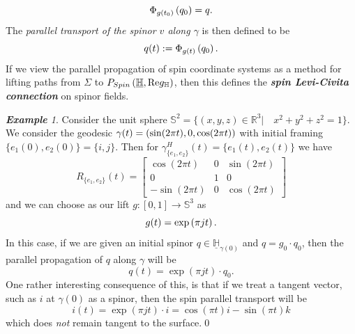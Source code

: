 \documentclass[openany, 11pt]{article}
\theoremstyle{definition}
\theoremstyle{remark}
\newtheorem*{example*}{\textbf{Example}}
\def\lp{\ensuremath{\left(}}
\def\rp{\ensuremath{\right)}}
\def\bH{\ensuremath{\mathbb{H}}}
\def\bR{\ensuremath{\mathbb{R}}}
\def\bS{\ensuremath{\mathbb{S}}}
\begin{document}
\[
    \Phi_{g(t_0)}\lp q_0\rp=q.
\]
The \emph{parallel transport of the spinor $v$ along $\gamma$} is then defined to be
\[
    q(t):=\Phi_{g(t)}\lp q_0\rp.
\]
If we view the parallel propagation of spin coordinate systems as a method for lifting paths from $\Sigma$ to $P_{Spin}\lp \underline{\bH},\text{Re}g_{\bH}\rp$, then this defines the \textbf{\emph{spin Levi-Civita connection}} on spinor fields.
\begin{example*}
Consider the unit sphere $\bS^2=\bigl\{(x,y,z)\in\bR^3\big|\quad x^2+y^2+z^2=1\bigr\}$. We consider the geodesic $\gamma(t)=\lp \sin(2\pi t),0,\cos(2\pi t)\rp$ with initial framing $\{ e_1(0),e_2(0)\}=\{ i,j\}$. Then for $\gamma^H_{\{e_1,e_2\}}(t)=\{ e_1(t),e_2(t)\}$ we have
\[
    R_{\{ e_1,e_2\}}(t)=\begin{bmatrix}
        \cos(2\pi t) & 0 & \sin(2\pi t)\\
        0 & 1 & 0\\
        -\sin(2\pi t) & 0 & \cos(2 \pi t)
    \end{bmatrix}
\]
and we can choose as our lift $g:[0,1]\rightarrow\bS^3$ as
\[
    g(t)=\exp\lp \pi jt\rp.
\]
In this case, if we are given an initial spinor $q\in\underline{\bH}_{\gamma(0)}$ and $q=g_0\cdot q_0$, then the parallel propagation of $q$ along $\gamma$ will be
\[
    q(t)=\exp(\pi jt)\cdot q_0.
\] One rather interesting consequence of this, is that if we treat a tangent vector, such as $i$ at $\gamma(0)$ as a spinor, then the spin parallel transport will be
\[
    i(t)=\exp(\pi jt)\cdot i=\cos(\pi t)i-\sin(\pi t)k
\]
which does \emph{not} remain tangent to the surface.\qed\par

\end{example*}
\end{document}

